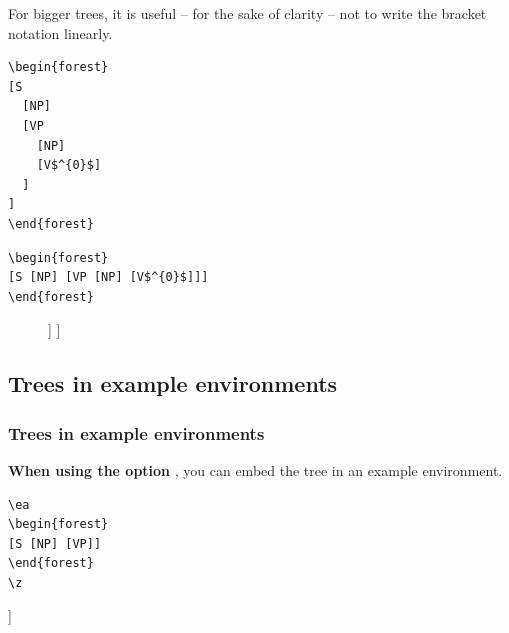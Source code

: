 \begin{frame}[fragile]

For bigger trees, it is useful -- for the sake of clarity -- not to write the bracket notation linearly.

\begin{minipage}[t]{.48\textwidth}
\small	
\begin{lstlisting}
\begin{forest}
[S 
  [NP] 
  [VP
    [NP]
    [V$^{0}$]
  ]
]
\end{forest}
\end{lstlisting}

\vs

\begin{lstlisting}
\begin{forest}
[S [NP] [VP [NP] [V$^{0}$]]]
\end{forest}
\end{lstlisting}
\end{minipage}
\begin{minipage}[t]{.48\textwidth}
\begin{figure}

\centering
\begin{forest}
	[S 
	[NP] 
	[VP
	[NP]
	[V$^{0}$]
	]
	]
\end{forest}

\end{figure}

\end{minipage}

\end{frame}


\subsection{Trees in example environments}

\begin{frame}[fragile]
\frametitle{Trees in example environments}

\textbf{When using the option }, you can embed the tree in an example environment.


\begin{lstlisting}
\ea 
\begin{forest}
[S [NP] [VP]]
\end{forest}
\z
\end{lstlisting}

\ea 
\begin{forest}
	[S [NP] [VP]]
\end{forest}
\z 

\end{frame}


